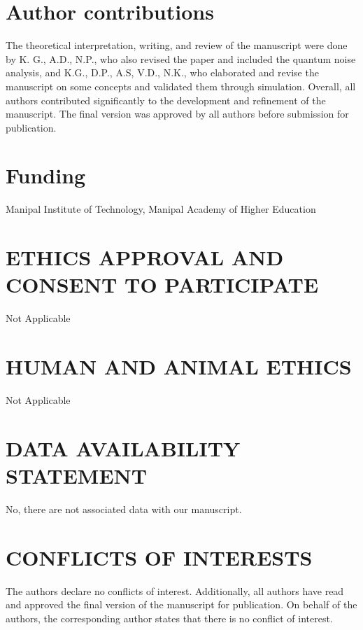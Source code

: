 \documentclass[journal,twocolumn]{IEEEtran}
\begin{document}
\section*{Author contributions}
The theoretical interpretation, writing, and review of the manuscript were done by K. G., A.D., N.P., who also revised the paper and included the quantum noise analysis, and K.G., D.P., A.S, V.D., N.K., who elaborated and revise the manuscript on some concepts and validated them through simulation. Overall, all authors contributed significantly to the development and refinement of the manuscript. The final version was approved by all authors before submission for publication.


\section*{Funding}
Manipal Institute of Technology, Manipal Academy of Higher Education


\section*{ETHICS APPROVAL AND CONSENT TO PARTICIPATE}
Not Applicable

\section*{HUMAN AND ANIMAL ETHICS}
Not Applicable

\section*{DATA AVAILABILITY STATEMENT}
No, there are not associated data with our manuscript.

\section*{CONFLICTS OF INTERESTS}
 The authors declare no conflicts of interest. Additionally, all authors have read and approved the final version of the manuscript for publication. On behalf of the authors, the corresponding author states that there is no conflict of interest.


\end{document}

